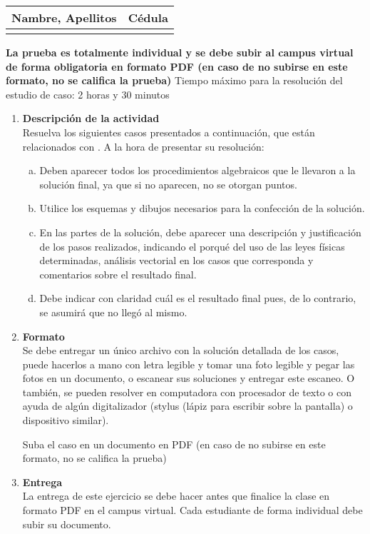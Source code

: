 \begin{center}
\begin{tabular}{|C{0.59\textwidth}|C{0.3\textwidth}|}
\hline
\textbf{Nambre, Apellitos} & \textbf{Cédula} \\ \hline
         & \\ \hline
\end{tabular}
\end{center}
\noindent
\textbf{La prueba es totalmente individual y se debe subir al campus virtual
  de forma obligatoria en formato PDF
  (en caso de no subirse en este formato, no se califica la prueba) }
Tiempo máximo para la resolución del estudio de caso: 2 horas y 30 minutos
\renewcommand{\labelenumi}{\textbf{\arabic{enumi}.}}
\begin{enumerate}
\item \textbf{Descripción de la actividad} \\
  Resuelva los siguientes casos presentados a continuación,
  que están relacionados con \topics.
  A la hora de presentar su resolución:
  \begin{enumerate}[a.]
    \item Deben aparecer todos los procedimientos algebraicos que le llevaron
      a la solución final, ya que si no aparecen, no se otorgan puntos.
    \item Utilice los esquemas y dibujos necesarios para la confección de
      la solución.
    \item En las partes de la solución, debe aparecer una descripción y
      justificación de los pasos realizados,
      indicando el porqué del uso de las leyes físicas determinadas,
      análisis vectorial en los casos que corresponda y
      comentarios sobre el resultado final.
    \item Debe indicar con claridad cuál es el resultado final pues,
      de lo contrario, se asumirá que no llegó al mismo.
  \end{enumerate}
\item \textbf{Formato}\\
  Se debe entregar un único archivo con la solución detallada de los casos,
  puede hacerlos a mano con letra legible y tomar una foto legible y
  pegar las fotos en un documento,
  o escanear sus soluciones y entregar este escaneo.
  O también, se pueden resolver en computadora con procesador de texto o
  con ayuda de algún digitalizador
  (stylus (lápiz para escribir sobre la pantalla) o dispositivo similar).

  Suba el caso en un documento en PDF
  (en caso de no subirse en este formato, no se califica la prueba)
\item \textbf{Entrega}\\
  La entrega de este ejercicio se debe hacer antes que finalice la clase
  en formato PDF en el campus virtual.
  Cada estudiante de forma individual debe subir su documento.
\end{enumerate}
